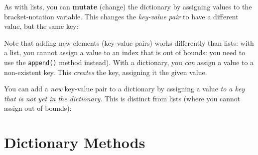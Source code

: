 \documentclass[]{book}
\newenvironment{Shaded}{\begin{snugshade}}{\end{snugshade}}
\newcommand{\DecValTok}[1]{\textcolor[rgb]{0.00,0.00,0.81}{#1}}
\newcommand{\FloatTok}[1]{\textcolor[rgb]{0.00,0.00,0.81}{#1}}
\newcommand{\StringTok}[1]{\textcolor[rgb]{0.31,0.60,0.02}{#1}}
\newcommand{\CommentTok}[1]{\textcolor[rgb]{0.56,0.35,0.01}{\textit{#1}}}
\newcommand{\OperatorTok}[1]{\textcolor[rgb]{0.81,0.36,0.00}{\textbf{#1}}}
\newcommand{\BuiltInTok}[1]{#1}
\newcommand{\NormalTok}[1]{#1}
\begin{document}
As with lists, you can \textbf{mutate} (change) the dictionary by
assigning values to the bracket-notation variable. This changes the
\emph{key-value pair} to have a different value, but the same key:

\begin{Shaded}
\end{Shaded}

Note that adding new elements (key-value pairs) works differently than
lists: with a list, you cannot assign a value to an index that is out of
bounds: you need to use the \texttt{append()} method instead). With a
dictionary, you \emph{can} assign a value to a non-existent key. This
\emph{creates} the key, assigning it the given value.

You can add a \emph{new} key-value pair to a dictionary by assigning a
value \emph{to a key that is not yet in the dictionary}. This is
distinct from lists (where you cannot assign out of bounds):

\hypertarget{dictionary-methods}{\section{Dictionary
Methods}\label{dictionary-methods}}
\end{document}
